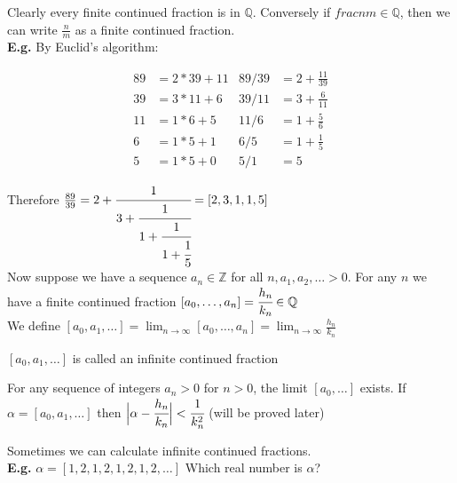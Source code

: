 \documentclass[11pt]{article}
\begin{document}
$ $\\
Clearly every finite continued fraction is in $\mathbb{Q}$. Conversely if $frac{n}{m} \in \mathbb{Q}$, then we can write $\frac{n}{m}$ as a finite continued fraction.\\[1em]

$ $ \\
\textbf{E.g.} By Euclid's algorithm:

\begin{align*}
	89 &= 2*39+ 11 & 89/39 &= 2 + \frac{11}{39}\\[0.5em]
	39 &= 3*11 + 6 & 39/11 &= 3 + \frac{6}{11}\\[0.5em]
	11 &= 1*6 + 5 & 11/6 &= 1+\frac{5}{6} \\[0.5em]
	6 &= 1*5+1 &  6/5 &= 1 + \frac{1}{5}\\[0.5em]
	5 &= 1*5 + 0 & 5/1 &= 5 
\end{align*}

Therefore $\frac{89}{39} = 2+ \cfrac{1}{3+ \cfrac{1}{1+\cfrac{1}{1+\cfrac{1}{5}}}} = [2,3,1,1,5]$\\[1em]

Now suppose we have a sequence $a_n \in \mathbb{Z}$ for all $n, a_1, a_2, \dots > 0$. For any $n$ we have a finite continued fraction $[a_0, \dots, a_n] = \cfrac{h_n}{k_n} \in \mathbb{Q}$\\[1em]
We define $[a_0, a_1, \dots] = \displaystyle{\lim_{n \to \infty} } [a_0, \dots , a_n] = \displaystyle{\lim_{n \to \infty}} \frac{h_n}{k_n}$



\begin{definition}
	$[a_0, a_1, \dots ]$ is called an infinite continued fraction
\end{definition}


\begin{theorem}
	For any sequence of integers $a_n > 0 $ for $n>0$, the limit $[a_0, \dots] $ exists. If $\alpha = [a_0,a_1,\dots] $ then $\Big| \alpha - \cfrac{h_n}{k_n}\Big| < \cfrac{1}{k_n^2}$ (will be proved later)
\end{theorem}


Sometimes we can calculate infinite continued fractions.\\[1em]

$ $\\
\textbf{E.g.} $\alpha = [1,2,1,2,1,2,1,2,\dots]$ Which real number is $\alpha$?
\end{document}
